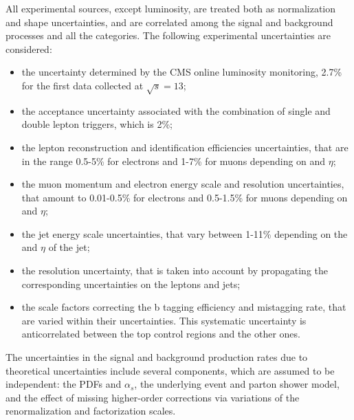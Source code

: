 All experimental sources, except luminosity, are treated both as normalization and shape uncertainties, and are correlated among the signal and background processes and all the categories. The following experimental uncertainties are considered:
\begin{itemize}
\item the uncertainty determined by the CMS online luminosity monitoring, 2.7\% for the first data collected at $\sqrt{s}=13$\TeV;
\item the acceptance uncertainty associated with the combination of single and double lepton triggers, which is 2\%;
\item the lepton reconstruction and identification efficiencies uncertainties, that are in the range 0.5-5\% for electrons and 1-7\% for muons depending on \pt and $\eta$;
\item the muon momentum and electron energy scale and resolution uncertainties, that amount to 0.01-0.5\% for electrons and 0.5-1.5\% for muons depending on \pt and $\eta$;
\item the jet energy scale uncertainties, that vary between 1-11\% depending on the \pt and $\eta$ of the jet;
\item the \MET resolution uncertainty, that is taken into account by propagating the corresponding uncertainties on the leptons and jets;
\item the scale factors correcting the b tagging efficiency and mistagging rate, that are varied within their uncertainties. This systematic uncertainty is anticorrelated between the top control regions and the other ones.
\end{itemize}

The uncertainties in the signal and background production rates due
to theoretical uncertainties include several components, which are assumed to be
independent: the PDFs and $\alpha_{s}$, the underlying event and parton shower model,
and the effect of missing higher-order corrections via variations of the renormalization
and factorization scales.

